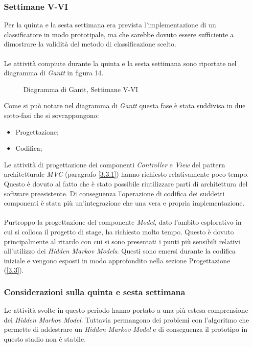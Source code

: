 \subsubsection{Settimane V-VI}
\label{3.1.3}
Per la quinta e la sesta settimana era prevista l'implementazione di un classificatore in modo prototipale, ma che sarebbe dovuto essere sufficiente a dimostrare la validità del metodo di classificazione scelto.\\\\
Le attività compiute durante la quinta e la sesta settimana sono riportate nel diagramma di \emph{Gantt} in figura 14.
\begin{figure}[H]
\centering
\noindent{}
\caption{Diagramma di Gantt, Settimane V-VI}
\end{figure}

Come si può notare nel diagramma di \emph{Gantt} questa fase è stata suddivisa in due sotto-fasi che si sovrappongono:
\begin{itemize}
\item Progettazione;
\item Codifica;
\end{itemize}
Le attività di progettazione dei componenti \emph{Controller} e \emph{View} del pattern architetturale \emph{MVC} (paragrafo \ref{3.3.1}) hanno richiesto relativamente poco tempo. Questo è dovuto al fatto che è stato possibile riutilizzare parti di architettura del software preesistente. Di conseguenza l'operazione di codifica dei suddetti componenti è stata più un'integrazione che una vera e propria implementazione.\\\\
Purtroppo la progettazione del componente \emph{Model}, dato l'ambito esplorativo in cui si colloca il progetto di stage, ha richiesto molto tempo. Questo è dovuto principalmente al ritardo con cui si sono presentati i punti più sensibili relativi all'utilizzo dei \emph{Hidden Markov Models}. Questi sono emersi durante la codifica iniziale e vengono esposti in modo approfondito nella sezione Progettazione (\ref{3.3}).


\subsubsection*{Considerazioni sulla quinta e sesta settimana}
\label{3.1.3.1}
Le attività svolte in questo periodo hanno portato a una più estesa comprensione dei \emph{Hidden Markov Model}. Tuttavia permangono dei problemi con l'algoritmo che permette di addestrare un \emph{Hidden Markov Model} e di conseguenza il prototipo in questo stadio non è stabile.
